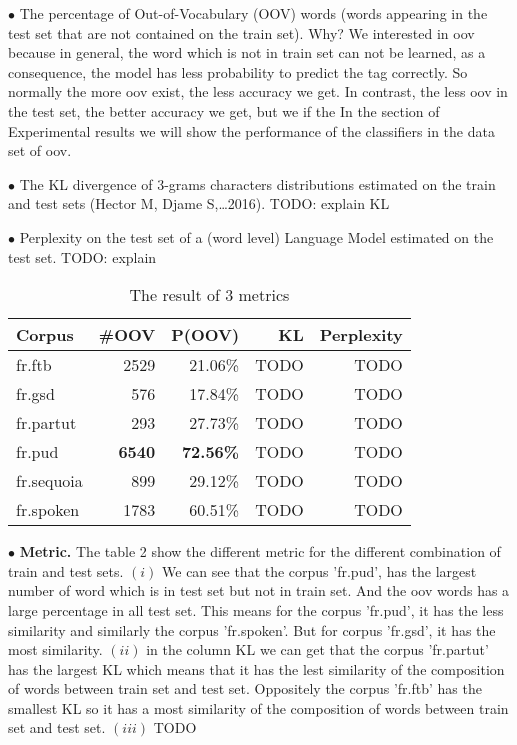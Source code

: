 \documentclass{article}
\begin{document}
$\bullet$ The percentage of Out-of-Vocabulary (OOV) words (words appearing in the test set that are not contained on the train set).
\textsf{Why?} We interested in oov because in general, the word which is not in train set can not be learned, as a consequence, the model has less probability to predict the tag correctly. So normally the more oov exist, the less accuracy we get. In contrast, the less oov in the test set, the better accuracy we get, but we if the  In the section of Experimental results we will show the performance of the classifiers in the data set of oov.

$\bullet$ The KL divergence of 3-grams characters distributions estimated on the train and test sets (Hector M, Djame S,\dots 2016). TODO: explain KL

$\bullet$ Perplexity on the test set of a (word level) Language Model estimated on the test set. TODO: explain

\begin{table}[h]
    \caption{The result of 3 metrics}
    \vspace{5pt}
    \centering
    
\begin{tabular}{|l|rr|r|r|}
\hline
Corpus & \#OOV & P(OOV) & KL & Perplexity\\
\hline
fr.ftb     & 2529 & 21.06\% & TODO & TODO \\
fr.gsd     & 576 & 17.84\% & TODO  & TODO\\
fr.partut  & 293   & 27.73\%  & TODO  & TODO\\
fr.pud     & \textbf{6540}   & \textbf{72.56\%}  & TODO & TODO\\
fr.sequoia & 899  & 29.12\%  &  TODO & TODO\\
fr.spoken  & 1783  & 60.51\%  & TODO  &TODO \\
\hline
\end{tabular}
\end{table}

$\bullet$ \textbf{Metric.} The table 2 show the different metric for the different combination of train and test sets. $(i)$ We can see that the corpus 'fr.pud', has the largest number of word which is in test set but not in train set. And the oov words has a large percentage in all test set. This means for the corpus 'fr.pud', it has the less similarity and similarly the corpus 'fr.spoken'. But for corpus 'fr.gsd', it has the most similarity. $(ii)$ in the column KL we can get that the corpus 'fr.partut' has the largest KL which means that it has the lest similarity of the composition of words between train set and test set. Oppositely the corpus 'fr.ftb' has the smallest KL so it has a most similarity of the composition of words between train set and test set. $(iii)$ TODO
\end{document}
